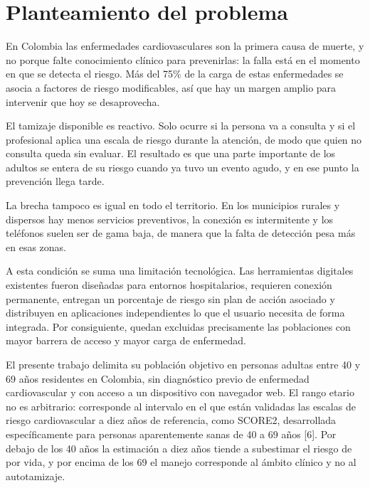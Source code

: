 \documentclass[conference]{IEEEtran}
\begin{document}
\section{Planteamiento del problema}
En Colombia las enfermedades cardiovasculares son la primera causa de muerte, y no porque falte conocimiento clínico para prevenirlas: la falla está en el momento en que se detecta el riesgo. Más del 75\% de la carga de estas enfermedades se asocia a factores de riesgo modificables, así que hay un margen amplio para intervenir que hoy se desaprovecha.

El tamizaje disponible es reactivo. Solo ocurre si la persona va a consulta y si el profesional aplica una escala de riesgo durante la atención, de modo que quien no consulta queda sin evaluar. El resultado es que una parte importante de los adultos se entera de su riesgo cuando ya tuvo un evento agudo, y en ese punto la prevención llega tarde.

La brecha tampoco es igual en todo el territorio. En los municipios rurales y dispersos hay menos servicios preventivos, la conexión es intermitente y los teléfonos suelen ser de gama baja, de manera que la falta de detección pesa más en esas zonas.

A esta condición se suma una limitación tecnológica. Las herramientas digitales existentes fueron diseñadas para entornos hospitalarios, requieren conexión permanente, entregan un porcentaje de riesgo sin plan de acción asociado y distribuyen en aplicaciones independientes lo que el usuario necesita de forma integrada. Por consiguiente, quedan excluidas precisamente las poblaciones con mayor barrera de acceso y mayor carga de enfermedad.

El presente trabajo delimita su población objetivo en personas adultas entre 40 y 69 años residentes en Colombia, sin diagnóstico previo de enfermedad cardiovascular y con acceso a un dispositivo con navegador web. El rango etario no es arbitrario: corresponde al intervalo en el que están validadas las escalas de riesgo cardiovascular a diez años de referencia, como SCORE2, desarrollada específicamente para personas aparentemente sanas de 40 a 69 años [6]. Por debajo de los 40 años la estimación a diez años tiende a subestimar el riesgo de por vida, y por encima de los 69 el manejo corresponde al ámbito clínico y no al autotamizaje.
\end{document}
